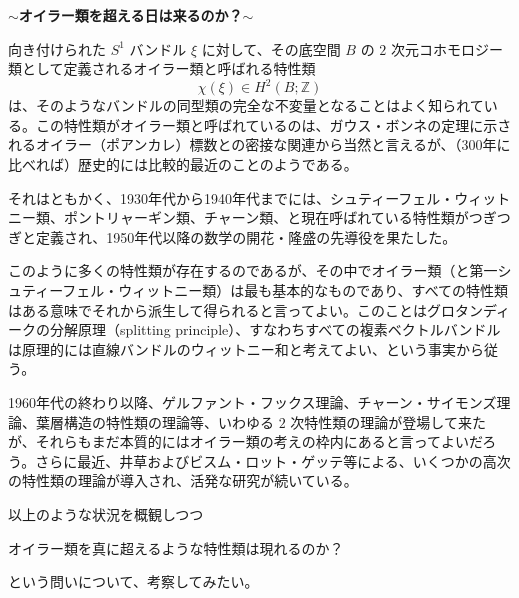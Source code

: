 \documentclass[uplatex,dvipdfmx]{jlreq}
\begin{document}
\newpage

\begin{center}
{\large\bfseries $\sim$オイラー類を超える日は来るのか？$\sim$}\\[6pt]
\hspace*{\fill}{\large\bfseries 森田　茂之（東京大学大学院数理科学研究科）}
\end{center}

向き付けられた $S^1$ バンドル $\xi$ に対して、その底空間 $B$ の $2$ 次元コホモロジー類として定義されるオイラー類と呼ばれる特性類
\[
\chi(\xi)\in H^2(B;\mathbb{Z})
\]
は、そのようなバンドルの同型類の完全な不変量となることはよく知られている。この特性類がオイラー類と呼ばれているのは、ガウス・ボンネの定理に示されるオイラー（ポアンカレ）標数との密接な関連から当然と言えるが、（300年に比べれば）歴史的には比較的最近のことのようである。

それはともかく、1930年代から1940年代までには、シュティーフェル・ウィットニー類、ポントリャーギン類、チャーン類、と現在呼ばれている特性類がつぎつぎと定義され、1950年代以降の数学の開花・隆盛の先導役を果たした。

このように多くの特性類が存在するのであるが、その中でオイラー類（と第一シュティーフェル・ウィットニー類）は最も基本的なものであり、すべての特性類はある意味でそれから派生して得られると言ってよい。このことはグロタンディークの分解原理（splitting principle）、すなわちすべての複素ベクトルバンドルは原理的には直線バンドルのウィットニー和と考えてよい、という事実から従う。

1960年代の終わり以降、ゲルファント・フックス理論、チャーン・サイモンズ理論、葉層構造の特性類の理論等、いわゆる $2$ 次特性類の理論が登場して来たが、それらもまだ本質的にはオイラー類の考えの枠内にあると言ってよいだろう。さらに最近、井草およびビスム・ロット・ゲッテ等による、いくつかの高次の特性類の理論が導入され、活発な研究が続いている。

以上のような状況を概観しつつ
\begin{center}
オイラー類を真に超えるような特性類は現れるのか？
\end{center}
という問いについて、考察してみたい。
\end{document}
